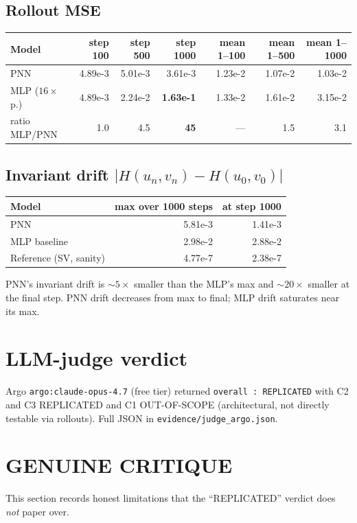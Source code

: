 \documentclass[11pt]{article}
\begin{document}
\subsection{Rollout MSE}
\begin{center}
\begin{tabular}{lrrrrrr}
\toprule
Model & step 100 & step 500 & step 1000 & mean 1--100 & mean 1--500 & mean 1--1000 \\
\midrule
PNN                 & 4.89e-3 & 5.01e-3 & 3.61e-3            & 1.23e-2 & 1.07e-2 & 1.03e-2 \\
MLP ($16\times$ p.) & 4.89e-3 & 2.24e-2 & \textbf{1.63e-1}   & 1.33e-2 & 1.61e-2 & 3.15e-2 \\
ratio MLP/PNN       & 1.0     & 4.5     & \textbf{45}        & ---     & 1.5     & 3.1     \\
\bottomrule
\end{tabular}
\end{center}

\subsection{Invariant drift $|H(u_n,v_n)-H(u_0,v_0)|$}
\begin{center}
\begin{tabular}{lrr}
\toprule
Model & max over 1000 steps & at step 1000 \\
\midrule
PNN                     & 5.81e-3 & 1.41e-3 \\
MLP baseline            & 2.98e-2 & 2.88e-2 \\
Reference (SV, sanity)  & 4.77e-7 & 2.38e-7 \\
\bottomrule
\end{tabular}
\end{center}

PNN's invariant drift is $\sim 5\times$ smaller than the MLP's max and
$\sim 20\times$ smaller at the final step. PNN drift decreases from max to
final; MLP drift saturates near its max.

\section{LLM-judge verdict}
Argo \texttt{argo:claude-opus-4.7} (free tier) returned \texttt{overall :
REPLICATED} with C2 and C3 REPLICATED and C1 OUT-OF-SCOPE (architectural,
not directly testable via rollouts). Full JSON in
\texttt{evidence/judge\_argo.json}.

\section{GENUINE CRITIQUE}
This section records honest limitations that the ``REPLICATED'' verdict does
\emph{not} paper over.
\end{document}
